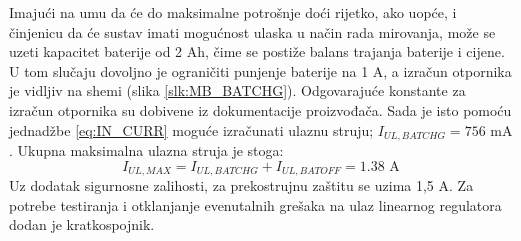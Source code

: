 Imajući na umu da će do maksimalne potrošnje doći rijetko, ako uopće, i činjenicu da će sustav imati mogućnost ulaska u način rada mirovanja, može se uzeti kapacitet baterije od 2 Ah, čime se postiže balans trajanja baterije i cijene. U tom slučaju dovoljno je ograničiti punjenje baterije na 1 A, a izračun otpornika je vidljiv na shemi (slika \ref{slk:MB_BATCHG}). Odgovarajuće konstante za izračun otpornika su dobivene iz dokumentacije proizvođača. Sada je isto pomoću jednadžbe \ref{eq:IN_CURR} moguće izračunati ulaznu struju; ${I_{UL,BATCHG} = 756\textrm{ mA}}$. Ukupna maksimalna ulazna struja je stoga:
\begin{equation}
    I_{UL,MAX}=I_{UL,BATCHG}+I_{UL,BATOFF} = 1.38\textrm{ A}
    \label{eq:IN_CURR_MAX}
\end{equation}
Uz dodatak sigurnosne zalihosti, za prekostrujnu zaštitu se uzima 1,5 A. Za potrebe testiranja i otklanjanje evenutalnih grešaka na ulaz linearnog regulatora dodan je kratkospojnik.

